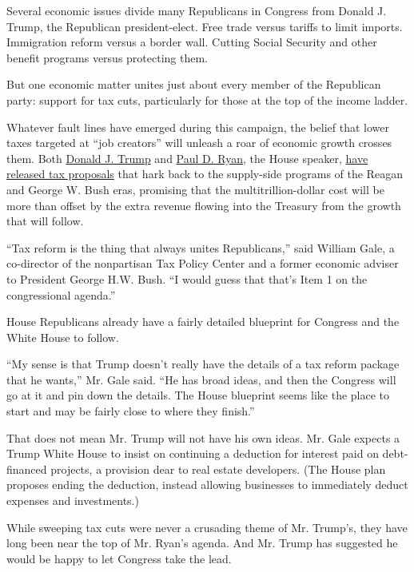 Several economic issues divide many Republicans in Congress from Donald
J. Trump, the Republican president-elect. Free trade versus tariffs to
limit imports. Immigration reform versus a border wall. Cutting Social
Security and other benefit programs versus protecting them.

But one economic matter unites just about every member of the Republican
party: support for tax cuts, particularly for those at the top of the
income ladder.

Whatever fault lines have emerged during this campaign, the belief that
lower taxes targeted at ``job creators'' will unleash a roar of economic
growth crosses them. Both
\href{https://www.donaldjtrump.com/policies/tax-plan}{Donald J. Trump}
and
\href{https://abetterway.speaker.gov/_assets/pdf/ABetterWay-Tax-Snapshot.pdf}{Paul
D. Ryan}, the House speaker,
\href{https://abetterway.speaker.gov/_assets/pdf/ABetterWay-Tax-Snapshot.pdf}{have
released tax proposals} that hark back to the supply-side programs of
the Reagan and George W. Bush eras, promising that the
multitrillion-dollar cost will be more than offset by the extra revenue
flowing into the Treasury from the growth that will follow.

``Tax reform is the thing that always unites Republicans,'' said William
Gale, a co-director of the nonpartisan Tax Policy Center and a former
economic adviser to President George H.W. Bush. ``I would guess that
that's Item 1 on the congressional agenda.''

House Republicans already have a fairly detailed blueprint for Congress
and the White House to follow.

``My sense is that Trump doesn't really have the details of a tax reform
package that he wants,'' Mr. Gale said. ``He has broad ideas, and then
the Congress will go at it and pin down the details. The House blueprint
seems like the place to start and may be fairly close to where they
finish.''

That does not mean Mr. Trump will not have his own ideas. Mr. Gale
expects a Trump White House to insist on continuing a deduction for
interest paid on debt-financed projects, a provision dear to real estate
developers. (The House plan proposes ending the deduction, instead
allowing businesses to immediately deduct expenses and investments.)

While sweeping tax cuts were never a crusading theme of Mr. Trump's,
they have long been near the top of Mr. Ryan's agenda. And Mr. Trump has
suggested he would be happy to let Congress take the lead.

